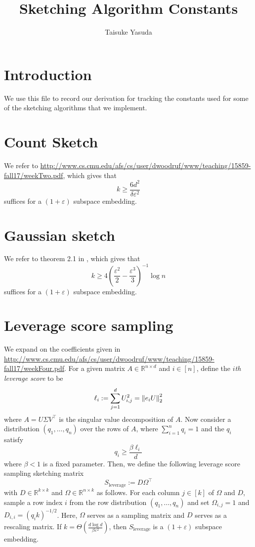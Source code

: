 \documentclass{article}
\title{Sketching Algorithm Constants}
\author{Taisuke Yasuda}
\begin{document}
\maketitle

\section{Introduction}
We use this file to record our derivation for tracking the constants used for some of the sketching algorithms that we implement. 

\section{Count Sketch}
We refer to \url{http://www.cs.cmu.edu/afs/cs/user/dwoodruf/www/teaching/15859-fall17/weekTwo.pdf}, which gives that
\[
	k\geq \frac{6d^2}{\delta\varepsilon^2}
\]
suffices for a $(1+\varepsilon)$ subspace embedding. 

\section{Gaussian sketch}
We refer to theorem 2.1 in \cite{dasgupta2003elementary}, which gives that
\[
	k\geq 4\left(\frac{\varepsilon^2}2-\frac{\varepsilon^3}3\right)^{-1}\log n
\]
suffices for a $(1+\varepsilon)$ subspace embedding. 

\section{Leverage score sampling}
We expand on the coefficients given in \url{http://www.cs.cmu.edu/afs/cs/user/dwoodruf/www/teaching/15859-fall17/weekFour.pdf}. For a given matrix $A\in\mathbb R^{n\times d}$ and $i\in[n]$, define the \emph{$i$th leverage score} to be
\[
	\ell_i := \sum_{j=1}^d U_{i,j}^2 = \left\Vert e_iU\right\Vert_2^2
\]
where $A = U\Sigma V^\top$ is the singular value decomposition of $A$. Now consider a distribution $(q_1,\dots,q_n)$ over the rows of $A$, where $\sum_{i=1}^n q_i = 1$ and the $q_i$ satisfy
\[
	q_i\geq\frac{\beta\ell_i}{d}
\]
where $\beta<1$ is a fixed parameter. Then, we define the following leverage score sampling sketching matrix
\[
	S_{\text{leverage}} := D\Omega^\top
\]
with $D\in\mathbb R^{k\times k}$ and $\Omega\in\mathbb R^{n\times k}$ as follows. For each column $j\in[k]$ of $\Omega$ and $D$, sample a row index $i$ from the row distribution $(q_1,\dots,q_n)$ and set $\Omega_{i,j} = 1$ and $D_{i,i} = (q_i k)^{-1/2}$. Here, $\Omega$ serves as a sampling matrix and $D$ serves as a rescaling matrix. If $k = \Theta\left(\frac{d\log d}{\beta\varepsilon^2}\right)$, then $S_{\text{leverage}}$ is a $(1+\varepsilon)$ subspace embedding. 
\end{document}
